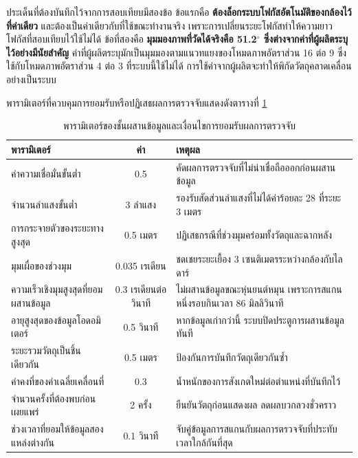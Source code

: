\documentclass[a4paper,12pt]{report}
\begin{document}
ประเด็นที่ต้องบันทึกไว้จากการสอบเทียบมีสองข้อ
ข้อแรกคือ \textbf{ต้องล็อกระบบโฟกัสอัตโนมัติของกล้องไว้ที่ค่าเดียว}
และต้องเป็นค่าเดียวกับที่ใช้ขณะทำงานจริง
เพราะการเปลี่ยนระยะโฟกัสทำให้ความยาวโฟกัสที่สอบเทียบไว้ใช้ไม่ได้
ข้อที่สองคือ \textbf{มุมมองภาพที่วัดได้จริงคือ 51.2$^\circ$
ซึ่งต่างจากค่าที่ผู้ผลิตระบุไว้อย่างมีนัยสำคัญ}
ค่าที่ผู้ผลิตระบุมักเป็นมุมมองตามแนวทแยงของโหมดภาพอัตราส่วน 16 ต่อ 9
ซึ่งใช้กับโหมดภาพอัตราส่วน 4 ต่อ 3 ที่ระบบนี้ใช้ไม่ได้
การใช้ค่าจากผู้ผลิตจะทำให้พิกัดวัตถุคลาดเคลื่อนอย่างเป็นระบบ

พารามิเตอร์ที่ควบคุมการยอมรับหรือปฏิเสธผลการตรวจจับแสดงดังตารางที่ \ref{tab:fuseparam}

\begin{table}[htbp]
\centering
\caption[พารามิเตอร์ของชั้นผสานข้อมูลและเงื่อนไขการยอมรับผลการตรวจจับ (บทที่ 4)]{พารามิเตอร์ของชั้นผสานข้อมูลและเงื่อนไขการยอมรับผลการตรวจจับ}
\label{tab:fuseparam}
\small
\begin{tabularx}{\textwidth}{|>{\raggedright\arraybackslash}p{4.4cm}|c|X|}
\hline
\textbf{พารามิเตอร์} & \textbf{ค่า} & \textbf{เหตุผล} \\
\hline
ค่าความเชื่อมั่นขั้นต่ำ & 0.5 & คัดผลการตรวจจับที่ไม่น่าเชื่อถือออกก่อนผสานข้อมูล \\
\hline
จำนวนลำแสงขั้นต่ำ & 3 ลำแสง & รองรับสัดส่วนลำแสงที่ไม่ได้ค่าร้อยละ 28 ที่ระยะ 3 เมตร \\
\hline
การกระจายตัวของระยะทางสูงสุด & 0.5 เมตร & ปฏิเสธกรณีที่ช่วงมุมคร่อมทั้งวัตถุและฉากหลัง \\
\hline
มุมเผื่อของช่วงมุม & 0.035 เรเดียน & ชดเชยระยะเยื้อง 3 เซนติเมตรระหว่างกล้องกับไลดาร์ \\
\hline
ความเร็วเชิงมุมสูงสุดที่ยอมผสานข้อมูล & 0.3 เรเดียนต่อวินาที & ไม่ผสานข้อมูลขณะหุ่นยนต์หมุน เพราะการสแกนหนึ่งรอบกินเวลา 86 มิลลิวินาที \\
\hline
อายุสูงสุดของข้อมูลโอดอมิเตอร์ & 0.5 วินาที & หากข้อมูลเก่ากว่านี้ ระบบปิดประตูการผสานข้อมูลทันที \\
\hline
ระยะรวมวัตถุเป็นชิ้นเดียวกัน & 0.5 เมตร & ป้องกันการบันทึกวัตถุเดียวกันซ้ำ \\
\hline
ค่าคงที่ของค่าเฉลี่ยเคลื่อนที่ & 0.3 & น้ำหนักของการสังเกตใหม่ต่อตำแหน่งที่บันทึกไว้ \\
\hline
จำนวนครั้งที่ต้องพบก่อนเผยแพร่ & 2 ครั้ง & ยืนยันวัตถุก่อนแสดงผล ลดผลบวกลวงชั่วคราว \\
\hline
ช่วงเวลาที่ยอมให้ข้อมูลสองแหล่งต่างกัน & 0.1 วินาที & จับคู่ข้อมูลการสแกนกับผลการตรวจจับที่ประทับเวลาใกล้กันที่สุด \\
\hline
\end{tabularx}
\end{table}
\end{document}
